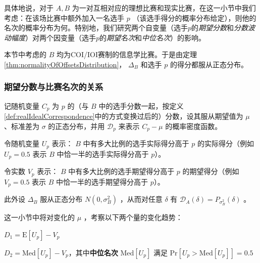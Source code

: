         具体地说，对于 $A,B$ 为一对互相对应的理想比赛和现实比赛，在这一小节中我们考虑：在该场比赛中额外加入一名选手 $p$ （该选手得分的概率分布给定），则他的名次的概率分布为何。特别地，我们研究两个自变量（选手$p$的\emph{期望分数}和\emph{分数波动幅度}）对两个因变量（选手$p$的\emph{期望名次}和\emph{中位名次}）的影响。

        本节中考虑的 $B$ 均为COI/IOI赛制的信息学比赛。于是由定理\ref{thm:normalityOfOffsetsDistribution}， $\Delta_B$ 和选手 $p$ 的得分都服从正态分布。

        \subsubsection{期望分数与比赛名次的关系}

            记随机变量 $C_p$ 为 $p$ 的（与 $B$ 中的选手分数一起，按定义\ref{def:realIdealCorrespondence}中的方式变换过后的）分数，设其服从期望值为 $\mu$ 、标准差为 $\sigma$ 的正态分布，并用 $\mathcal{D}_p$ 来表示 $C_p-\mu$ 的概率密度函数。

            令随机变量 $U_p$ 表示： $B$ 中有多大比例的选手实际得分高于 $p$ 的实际得分（例如 $U_p=0.5$ 表示 $B$ 中恰一半的选手实际得分高于 $p$）。

            令实数 $V_p$ 表示： $B$ 中有多大比例的选手期望得分高于 $p$ 的期望得分（例如 $V_p=0.5$ 表示 $B$ 中恰一半的选手期望得分高于 $p$）。

            此外设 $\Delta_B$ 服从正态分布 $N(0,\sigma_B^2)$ ，从而对任意 $\delta$ 有 $\mathcal{D}_A(\delta)=P_{\sigma_B^2}(\delta)$ 。

            \vspace{1.5ex}

            这一小节中将对变化的 $\mu$ ，考察以下两个量的变化趋势：
            \begin{asparaitem}
                \item $D_1=\mathrm{E}\left[U_p\right]-V_p$
                \item $D_2=\mathrm{Med}\left[U_p\right]-V_p$，其中\textbf{中位名次} $\mathrm{Med}\left[U_p\right]$ 满足 $\mathrm{Pr}\left[U_p>\mathrm{Med}\left[U_p\right]\right]=0.5$ 
            \end{asparaitem}

            \vspace{1.5ex}


